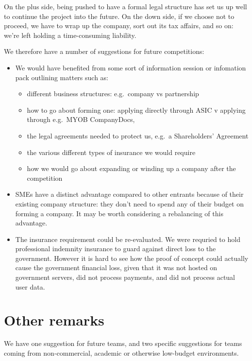 \documentclass[12pt,a4paper,twosided]{article}
\begin{document}
On the plus side, being pushed to have a formal legal structure has set
us up well to continue the project into the future. On the down side, if
we choose not to proceed, we have to wrap up the company, sort out its
tax affairs, and so on: we're left holding a time-consuming liability.

We therefore have a number of suggestions for future competitions:

\begin{itemize}
\item
  We would have benefited from some sort of information session or
  infomation pack outlining matters such as:
\begin{itemize}
\item 
  different business structures: e.g.~company vs partnership
\item
  how to go about forming one: applying directly through ASIC v applying
  through e.g.~MYOB CompanyDocs,
\item
  the legal agreements needed to protect us, e.g.~a Shareholders'
  Agreement
\item
  the various different types of insurance we would require
\item
  how we would go about expanding or winding up a company after the
  competition
\end{itemize}
\item
  SMEs have a distinct advantage compared to other entrants because of
  their existing company structure: they don't need to spend any of
  their budget on forming a company. It may be worth considering a rebalancing
  of this advantage.
\item
  The insurance requirement could be re-evaluated. We were requried to
  hold professional indemnity insurance to guard against direct loss to
  the government. However it is hard to see how the proof of concept
  could actually cause the government financial loss, given that it was
  not hosted on government servers, did not process payments, and did
  not process actual user data.
\end{itemize}

\newpage
\section{Other remarks}

We have one suggestion for future teams, and two specific suggestions
for teams coming from non-commercial, academic or otherwise low-budget
environments.
\end{document}
